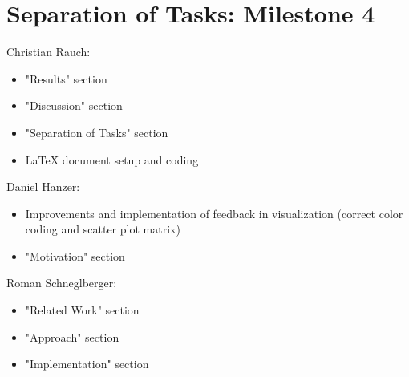 \documentclass{vgtc}                          %
\begin{document}
\section{Separation of Tasks: Milestone 4}
Christian Rauch:
\begin{itemize}
\item "Results" section
\item "Discussion" section
\item "Separation of Tasks" section
\item LaTeX document setup and coding
\end{itemize}

Daniel Hanzer:
\begin{itemize}
\item Improvements and implementation of feedback in visualization (correct color coding and scatter plot matrix)
\item "Motivation" section
\end{itemize}

Roman Schneglberger:
\begin{itemize}
\item "Related Work" section
\item "Approach" section
\item "Implementation" section
\end{itemize}
\end{document}

